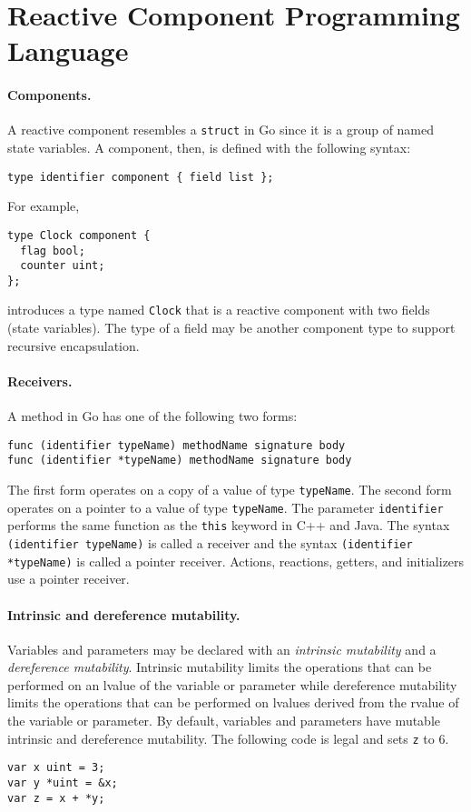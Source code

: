 \section{Reactive Component Programming Language}

\paragraph{Components.}
A reactive component resembles a \verb+struct+ in Go since it is a group of named state variables.
A component, then, is defined with the following syntax:
\begin{verbatim}
type identifier component { field list };
\end{verbatim}
For example,
\begin{verbatim}
type Clock component {
  flag bool;
  counter uint;
};
\end{verbatim}
introduces a type named \verb+Clock+ that is a reactive component with two fields (state variables).
The type of a field may be another component type to support recursive encapsulation.

\paragraph{Receivers.}
A method in Go has one of the following two forms:
\begin{verbatim}
func (identifier typeName) methodName signature body
func (identifier *typeName) methodName signature body
\end{verbatim}
The first form operates on a copy of a value of type \verb+typeName+.
The second form operates on a pointer to a value of type \verb+typeName+.
The parameter \verb+identifier+ performs the same function as the \verb+this+ keyword in C++ and Java.
The syntax \verb+(identifier typeName)+ is called a receiver and the syntax \verb+(identifier *typeName)+ is called a pointer receiver.
Actions, reactions, getters, and initializers use a pointer receiver.

\paragraph{Intrinsic and dereference mutability.}
Variables and parameters may be declared with an \emph{intrinsic mutability} and a \emph{dereference mutability}.
Intrinsic mutability limits the operations that can be performed on an lvalue of the variable or parameter while dereference mutability limits the operations that can be performed on lvalues derived from the rvalue of the variable or parameter.
By default, variables and parameters have mutable intrinsic and dereference mutability.
The following code is legal and sets \verb+z+ to 6.
\begin{verbatim}
var x uint = 3;
var y *uint = &x;
var z = x + *y;
\end{verbatim}

